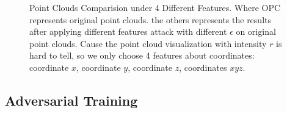 \begin{figure}[htbp]
%
%
%
%

\centering
\caption{Point Clouds Comparision under 4 Different Features. Where OPC represents original point clouds. the others represents the results after applying different features attack with different \(\epsilon\) on original point clouds. Cause the point cloud visualization with intensity \(r\) is hard to tell, so we only choose 4 features about coordinates: coordinate \(x\), coordinate \(y\), coordinate \(z\), coordinates \(xyz\). }
\label{fig:PC under 4 Features Comparsion}
\end{figure}
\subsection{Adversarial Training}

